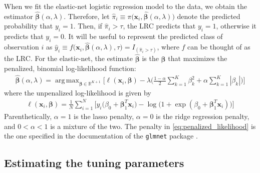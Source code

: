 \documentclass{article}
\DeclareMathOperator*{\argmax}{arg\,max}
\begin{document}
When we fit the elastic-net logistic regression model to the data, we obtain the estimator 
$\hat{\boldsymbol\beta}(\alpha,\lambda)$.  Therefore, 
let $\hat\pi_i \equiv \pi \bigl( \mathbf{x}_i,\hat{\boldsymbol\beta}(\alpha,\lambda) \bigr)$ denote the predicted probability 
that $y_i = 1$.  Then, if $\hat\pi_i > \tau$, the LRC predicts that $y_i = 1$, otherwise it predicts that $y_i = 0$.  
It will be useful to represent the predicted class of observation
$i$ as $\hat{y}_i \equiv f \bigl( \mathbf{x}_i,\hat{\boldsymbol{\beta}}(\alpha,\lambda),\tau \bigr) = 
I_{(\hat\pi_i > \tau)}$, where $f$ can be thought of as the LRC.
For the elastic-net, the estimate $\hat{\boldsymbol{\beta}}$ is the $\boldsymbol{\beta}$
that maximizes the penalized, binomial log-likelihood function:
\begin{align}
\label{eq:penalized_likelihood}
\hat{\boldsymbol{\beta}}(\alpha,\lambda) = \argmax_{\boldsymbol\beta \in \mathbb{R}^{K+1}} \Biggl[ \ell(\mathbf{x}_i,\boldsymbol{\beta}) - \lambda 
\biggl( \frac{1-\alpha}{2} \sum_{k=1}^K \beta_k^2 + \alpha \sum_{k=1}^K |\beta_k| \biggr) \Biggr]
\end{align}
\noindent where the unpenalized log-likelihood is given by
\begin{align}
\label{eq:unpenalized_likelihood}
\ell(\mathbf{x}_i,\boldsymbol{\beta}) = \frac{1}{N} \sum_{i=1}^N \biggl[ y_i \bigl( \beta_0 + \boldsymbol\beta_1^T\mathbf{x}_i \bigr) 
  - \log \bigl( 1 + \exp(\beta_0 + \boldsymbol\beta_1^T\mathbf{x}_i ) \bigl) \biggr]
\end{align}
\noindent Parenthetically, $\alpha = 1$ is the lasso penalty, $\alpha = 0$ is the ridge regression penalty,
and $0 < \alpha < 1$ is a mixture of the two. The penalty in \eqref{eq:penalized_likelihood} is the one 
specified in the documentation of the {\tt glmnet} package \cite{glmnet}.


\subsection{Estimating the tuning parameters}
\end{document}

